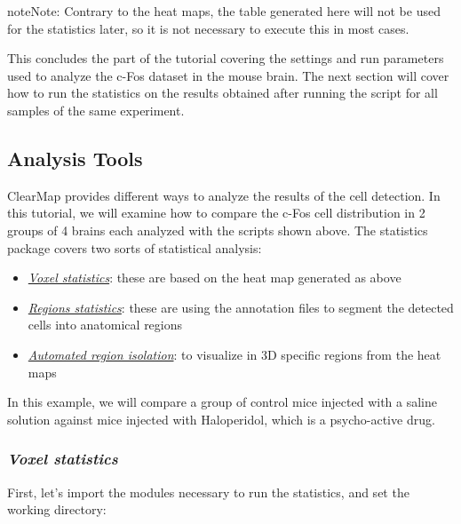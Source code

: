 \documentclass[letterpaper,10pt,english]{sphinxmanual}
\begin{document}
\begin{notice}{note}{Note:}
Contrary to the heat maps, the table generated here will not be used for the statistics later, so it is not necessary to execute this in most cases.
\end{notice}

This concludes the part of the tutorial covering the settings and run parameters used to analyze the c-Fos dataset in the mouse brain. The next section will cover how to run the statistics on the results obtained after running the  script for all samples of the same experiment.


\subsection{Analysis Tools}
\label{tutorial:analysis-tools}
ClearMap provides different ways to analyze the results of the cell detection. In this tutorial, we will examine how to compare the c-Fos cell distribution in 2 groups of 4 brains each analyzed with the scripts shown above. The statistics package covers two sorts of statistical analysis:
\begin{itemize}
\item {} 
{\hyperref[tutorial:voxel-statistics]{\emph{Voxel statistics}}}: these are based on the heat map generated as above

\item {} 
{\hyperref[tutorial:regions-statistics]{\emph{Regions statistics}}}: these are using the annotation files to segment the detected cells into anatomical regions

\item {} 
{\hyperref[tutorial:automated-region-isolation]{\emph{Automated region isolation}}}: to visualize in 3D specific regions from the heat maps

\end{itemize}

In this example, we will compare a group of control mice injected with a saline solution against mice injected with Haloperidol, which is a psycho-active drug.


\subsubsection{\emph{Voxel statistics}}
\label{tutorial:voxel-statistics}
First, let's import the modules necessary to run the statistics, and set the working directory:
\end{document}
